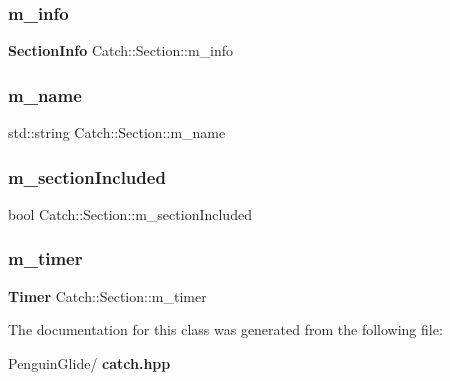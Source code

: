 \mbox{\label{class_catch_1_1_section_a22f54832b33b341ae5a78807a6219af6}} 
\subsubsection{m\_info}
{\footnotesize\ttfamily \textbf{ Section\+Info} Catch\+::\+Section\+::m\+\_\+info\hspace{0.3cm}{\ttfamily [private]}}

\mbox{\label{class_catch_1_1_section_a29a372077fda582bbd79fb192067f277}} 
\subsubsection{m\_name}
{\footnotesize\ttfamily std\+::string Catch\+::\+Section\+::m\+\_\+name\hspace{0.3cm}{\ttfamily [private]}}

\mbox{\label{class_catch_1_1_section_a038bb0d5d2718df6e3ae1ece4b3d695d}} 
\subsubsection{m\_sectionIncluded}
{\footnotesize\ttfamily bool Catch\+::\+Section\+::m\+\_\+section\+Included\hspace{0.3cm}{\ttfamily [private]}}

\mbox{\label{class_catch_1_1_section_a1548993afa64305a1b093391c6884b7e}} 
\subsubsection{m\_timer}
{\footnotesize\ttfamily \textbf{ Timer} Catch\+::\+Section\+::m\+\_\+timer\hspace{0.3cm}{\ttfamily [private]}}



The documentation for this class was generated from the following file\+:\begin{DoxyCompactItemize}
\item 
Penguin\+Glide/\textbf{ catch.\+hpp}\end{DoxyCompactItemize}
